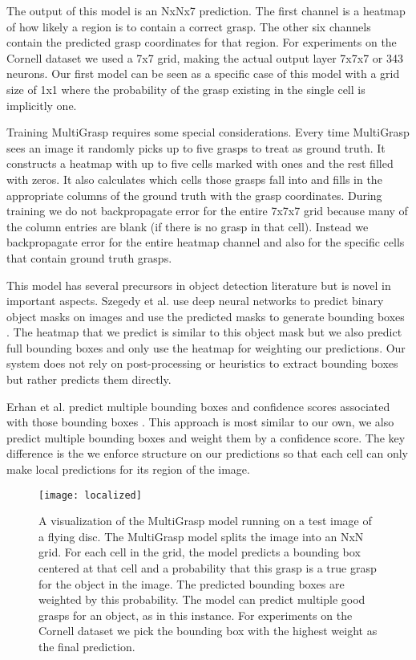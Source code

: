 \documentclass[letterpaper, 10 pt, conference]{ieeeconf}
\begin{document}
The output of this model is an NxNx7 prediction. The first channel is a heatmap of how likely a region is to contain a correct grasp. The other six channels contain the predicted grasp coordinates for that region. For experiments on the Cornell dataset we used a 7x7 grid, making the actual output layer 7x7x7 or 343 neurons. Our first model can be seen as a specific case of this model with a grid size of 1x1 where the probability of the grasp existing in the single cell is implicitly one.

Training MultiGrasp requires some special considerations. Every time MultiGrasp sees an image it randomly picks up to five grasps to treat as ground truth. It constructs a heatmap with up to five cells marked with ones and the rest filled with zeros. It also calculates which cells those grasps fall into and fills in the appropriate columns of the ground truth with the grasp coordinates. During training we do not backpropagate error for the entire 7x7x7 grid because many of the column entries are blank (if there is no grasp in that cell). Instead we backpropagate error for the entire heatmap channel and also for the specific cells that contain ground truth grasps.

This model has several precursors in object detection literature but is novel in important aspects. Szegedy et al. use deep neural networks to predict binary object masks on images and use the predicted masks to generate bounding boxes \cite{szegedy2013detection}. The heatmap that we predict is similar to this object mask but we also predict full bounding boxes and only use the heatmap for weighting our predictions. Our system does not rely on post-processing or heuristics to extract bounding boxes but rather predicts them directly.

Erhan et al. predict multiple bounding boxes and confidence scores associated with those bounding boxes \cite{erhan2013scalable}. This approach is most similar to our own, we also predict multiple bounding boxes and weight them by a confidence score. The key difference is the we enforce structure on our predictions so that each cell can only make local predictions for its region of the image.





   \begin{figure*}[thpb]
      \centering
        \texttt{[image: localized]}
      \caption{A visualization of the MultiGrasp model running on a test image of a flying disc. The MultiGrasp model splits the image into an NxN grid. For each cell in the grid, the model predicts a bounding box centered at that cell and a probability that this grasp is a true grasp for the object in the image. The predicted bounding boxes are weighted by this probability. The model can predict multiple good grasps for an object, as in this instance. For experiments on the Cornell dataset we pick the bounding box with the highest weight as the final prediction.}
      \label{localized}
   \end{figure*}
\end{document}
